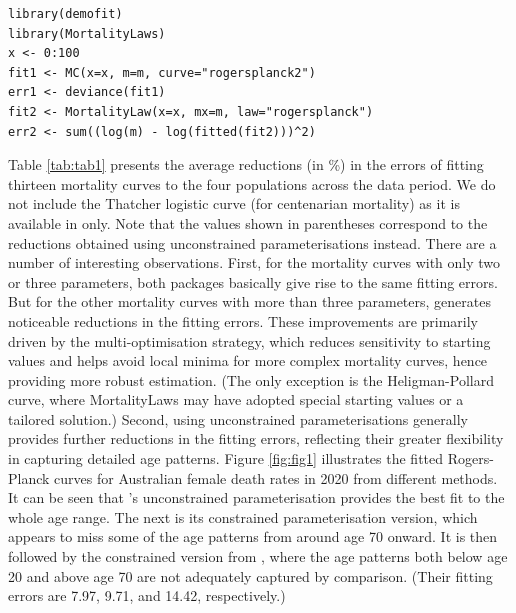 \begin{verbatim}
library(demofit)
library(MortalityLaws)
x <- 0:100
fit1 <- MC(x=x, m=m, curve="rogersplanck2")
err1 <- deviance(fit1)
fit2 <- MortalityLaw(x=x, mx=m, law="rogersplanck")
err2 <- sum((log(m) - log(fitted(fit2)))^2)
\end{verbatim}

Table \ref{tab:tab1} presents the average reductions (in \%) in the errors of fitting thirteen mortality curves to the four populations across the data period. We do not include the Thatcher logistic curve (for centenarian mortality) as it is available in  only. Note that the values shown in parentheses correspond to the reductions obtained using unconstrained parameterisations instead. There are a number of interesting observations. First, for the mortality curves with only two or three parameters, both packages basically give rise to the same fitting errors. But for the other mortality curves with more than three parameters,  generates noticeable reductions in the fitting errors. These improvements are primarily driven by the multi-optimisation strategy, which reduces sensitivity to starting values and helps avoid local minima for more complex mortality curves, hence providing more robust estimation. (The only exception is the Heligman-Pollard curve, where MortalityLaws may have adopted special starting values or a tailored solution.) Second, using unconstrained parameterisations generally provides further reductions in the fitting errors, reflecting their greater flexibility in capturing detailed age patterns. Figure \ref{fig:fig1} illustrates the fitted Rogers-Planck curves for Australian female death rates in 2020 from different methods. It can be seen that 's unconstrained parameterisation provides the best fit to the whole age range. The next is its constrained parameterisation version, which appears to miss some of the age patterns from around age 70 onward. It is then followed by the constrained version from , where the age patterns both below age 20 and above age 70 are not adequately captured by comparison. (Their fitting errors are 7.97, 9.71, and 14.42, respectively.)

